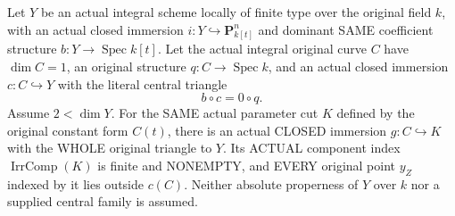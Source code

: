 \begin{theorem}
\label{thm:pl-gauss-original-finite-central-generics-outside-curve}
\leanok
Let $Y$ be an actual integral scheme locally of finite type over the
original field $k$, with an actual closed immersion
$i:Y\hookrightarrow\mathbf P^n_{k[t]}$ and dominant SAME coefficient
structure $b:Y\to\operatorname{Spec}k[t]$. Let the actual integral
original curve $C$ have $\dim C=1$, an original structure
$q:C\to\operatorname{Spec}k$, and an actual closed immersion
$c:C\hookrightarrow Y$ with the literal central triangle
\[
 b\circ c=0\circ q.
\]
Assume $2<\dim Y$. For the SAME actual parameter cut $K$ defined by
the original constant form $C(t)$, there is an actual CLOSED immersion
$g:C\hookrightarrow K$ with the WHOLE original triangle to $Y$.
Its ACTUAL component index $\operatorname{IrrComp}(K)$ is finite and
NONEMPTY, and EVERY original point $y_Z$ indexed by it lies outside
$c(C)$. Neither absolute properness of $Y$ over $k$ nor a supplied
central family is assumed.
\end{theorem}
